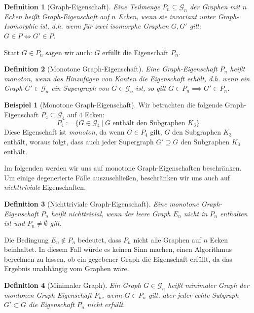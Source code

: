 \documentclass[10pt,a4paper, footheight=1mm]{scrreprt}
\newtheorem{definition}{Definition}
\theoremstyle{definition}
\newtheorem{examplex}{Beispiel}
\newenvironment{example}[1]
{ \begin{leftbar} \begin{examplex}#1}
{ \end{examplex} \ignorespacesafterend \end{leftbar} }
\begin{document}
\begin{definition}[Graph-Eigenschaft]
Eine Teilmenge $P_n \subseteq \mathcal{G}_n$ der Graphen mit
$n$ Ecken heißt \emph{Graph-Eigenschaft auf $n$ Ecken},
wenn sie invariant unter Graph-Isomorphie ist,
d.h. wenn für zwei isomorphe Graphen $G, G'$ gilt:
$G \in P \iff G' \in P$.
\end{definition}
Statt $G \in P_n$ sagen wir auch: $G$ erfüllt die Eigenschaft $P_n$.


\begin{definition}[Monotone Graph-Eigenschaft]
Eine Graph-Eigenschaft $P_n$ heißt \emph{monoton}, wenn das
Hinzufügen von Kanten die Eigenschaft erhält,
d.h. wenn ein Graph
$G' \in \mathcal{G}_n$ ein Supergraph von
$G \in \mathcal{G}_n$ ist, so gilt 
$G \in P_n \implies G' \in P_n$.
\end{definition}

\begin{example}[Monotone Graph-Eigenschaft]
\label{exmpl:Monotonie}
Wir betrachten die folgende Graph-Eigenschaft 
$P_4 \subseteq \mathcal{G}_4$ auf $4$ Ecken:
$$P_4 := \{ G \in \mathcal{G}_4 \ | \ G \text{ enthält den Subgraphen } K_3 \}$$
Diese Eigenschaft ist \emph{monoton}, da wenn 
$G \in P_4$ gilt, $G$ den Subgraphen $K_3$
enthält, woraus folgt, dass auch jeder Supergraph $G'\supseteq G$
den Subgraphen $K_3$ enthält. 
\end{example}

Im folgenden werden wir uns auf monotone Graph-Eigenschaften beschränken.
Um einige degenerierte Fälle auszuschließen, beschränken
wir uns auch auf \emph{nichttriviale} Eigenschaften.
\begin{definition}[Nichttriviale Graph-Eigenschaft]
Eine monotone Graph-Eigenschaft $P_n$ heißt \emph{nichttrivial},
wenn der leere Graph $E_n$ nicht in $P_n$ enthalten ist und
$P_n\neq \emptyset$ gilt.
\end{definition}
Die Bedingung $E_n \notin P_n$ bedeutet, dass $P_n$ nicht
alle Graphen auf $n$ Ecken beinhaltet. In diesem Fall würde
es keinen Sinn machen, einen Algorithmus berechnen zu lassen,
ob ein gegebener Graph die Eigenschaft erfüllt, da das Ergebnis
unabhängig vom Graphen wäre.

\begin{definition}[Minimaler Graph]
Ein Graph $G \in \mathcal{G}_n$ heißt
\emph{minimaler Graph der montonen Graph-Eigenschaft $P_n$},
wenn $G \in P_n$ gilt, aber jeder echte Subgraph 
$G' \subset G$ die Eigenschaft $P_n$ nicht erfüllt.
\end{definition}
\end{document}
